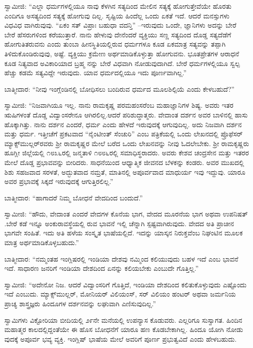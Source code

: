 ಸ್ವಾಮೀಜಿ: “ಎಲ್ಲಾ ಧರ್ಮಗಳಲ್ಲಿಯೂ ನಾವು ಕೆಳಗಿನ ಸತ್ಯದಿಂದ ಮೇಲಿನ ಸತ್ಯಕ್ಕೆ ಹೋಗುತ್ತೇವೆಯೇ ಹೊರತು ಎಂದಿಗೂ ಅಸತ್ಯದಿಂದ ಸತ್ಯಕ್ಕೆ ಹೋಗುವು ದಿಲ್ಲ. ಸೃಷ್ಟಿಯ ಹಿಂದೆಲ್ಲ ಒಂದು ಏಕತೆ ಇದೆ. ಆದರೆ ಮನಸ್ಸುಗಳು ವಿಧವಿಧ ವಾಗಿರುವುವು. “ಏಕಂ ಸತ್​ ವಿಪ್ರಾಃ ಬಹುಧಾ ವದನ್ತಿ” –ಇರುವುದು ಒಂದೇ, ಜ್ಞಾನಿಗಳು ಅದನ್ನು ಬೇರೆ ಬೇರೆ ಹೆಸರುಗಳಿಂದ ಕರೆಯುತ್ತಾರೆ. ನಾನು ಹೇಳುವು ದೇನೆಂದರೆ ವ್ಯಕ್ತಿಯು ಸಣ್ಣ ಸತ್ಯದಿಂದ ದೊಡ್ಡ ಸತ್ಯದೆಡೆಗೆ ಹೋಗುತಿತರುವನು ಎಂದು ತುಂಬಾ ಹೀನಸ್ಥಿತಿಯಲ್ಲಿರುವ ಧರ್ಮಗಳೂ ಕೂಡ ಏಕಮಾತ್ರ ಸತ್ಯವನ್ನು ತಪ್ಪಾಗಿ ತಿಳಿದುಕೊಂಡಿರುವುವು, ಅಷ್ಟೆ. ವ್ಯಕ್ತಿಯು ಕ್ರಮೇಣ ಅರ್ಥಮಾಡಿಕೊಳ್ಳುತ್ತಾ ಹೋಗುವನು. ಭೂತಪ್ರೇತಗಳ ಆರಾಧನೆ ಕೂಡ ನಿತ್ಯವಾದ ಅವಿಕಾರಿಯಾದ ಬ್ರಹ್ಮ ನನ್ನು ಬೇರೆ ವಿಧವಾಗಿ ನೋಡುವುದಾಗಿದೆ. ಬೇರೆ ಧರ್ಮಗಳಲ್ಲಿಯೂ ಸ್ವಲ್ಪ ಹೆಚ್ಚು ಕಡಮೆ ಸತ್ಯವಿದ್ದೇ ಇರುವುದು. ಯಾವ ಧರ್ಮದಲ್ಲಿಯೂ ಇದು ಪೂರ್ಣವಾಗಿಲ್ಲ.”

ಬಾತ್ಮೀದಾರ: “ನೀವು ಇಂಗ್ಲೆಂಡಿನಲ್ಲಿ ಬೋಧಿಸಲು ಬಂದಿರುವ ಧರ್ಮದ ಮೂಲಶಿಲ್ಪಿಯೆ ಎಂದು ಕೇಳಬಹುದೆ?”

ಸ್ವಾಮೀಜಿ: “ನಿಜವಾಗಿಯೂ ಇಲ್ಲ. ನಾನು ರಾಮಕೃಷ್ಣ ಪರಮಹಂಸರೆಂಬ ಮಹಾಜ್ಞಾನಿಗಳ ಶಿಷ್ಯ. ಅವರು ಇತರ ಋಷಿಗಳಂತೆ ದೊಡ್ಡ ವಿದ್ವಾಂಸರೇನೂ ಆಗಿರಲಿಲ್ಲ.ಆದರೆ ಪರಿಶುದ್ಧಾತ್ಮರು. ವೇದಾಂತ ದರ್ಶನ ಅವರ ಬಾಳಿನಲ್ಲಿ ಹಾಸು ಹೊಕ್ಕಾಗಿತ್ತು. ನಾನು ದರ್ಶನ ಎಂದರೆ, ಧರ್ಮ ಎಂದು ಹೇಳದೆ ಇರುವುದಕ್ಕೆ ಆಗುವುದಿಲ್ಲ. ಅದು ನಿಜವಾಗಿ ದರ್ಶನ ಮತ್ತು ಧರ್ಮ. ಇತ್ತೀಚೆಗೆ ಪ್ರಕಟವಾದ “ನೈಂಟೀಂತ್​ ಸೆಂಚುರಿ” ಎಂಬ ಪತ್ರಿಕೆಯಲ್ಲಿ ಒಂದು ಲೇಖನದಲ್ಲಿ ಪ್ರೊಫೆಸರ್​ ಮ್ಯಾಕ್ಸ್​ಮುಲ್ಲರ್​ರವರು ಶ‍್ರೀ ರಾಮಕೃಷ್ಣರ ಮೇಲೆ ಬರೆದ ಒಂದು ಲೇಖನವನ್ನು ನೀವು ಓದಲೇಬೇಕು. ಶ‍್ರೀ ರಾಮಕೃಷ್ಣರು ಹೂಗ್ಲೀ ಜಿಲ್ಲೆಯಲ್ಲಿ ೧೮೩೬ರಲ್ಲಿ ಜನ್ಮತಾಳಿ ೧೮೮೬ರಲ್ಲಿ ಸಮಾಧಿಸ್ಥರಾದರು. ಅವರು ಕೇಶವ ಚಂದ್ರಸೇನ ಮತ್ತು ಇತರರ ಮೇಲೆ ದೊಡ್ಡ ಪ್ರಭಾವವನ್ನು ಬೀರಿದರು. ಸಾಧನೆಯಿಂದ ಆಧ್ಯಾತ್ಮಿಕ ಜೀವನದ ಬೆಳಕನ್ನು ಕಂಡರು. ಅವರ ಮುಖದಲ್ಲಿ ಶಿಶು ಸಹಜವಾದ ಸರಳತೆ, ಅದ್ಭುತವಾದ ನಮ್ರತೆ, ಮಾತಿನಲ್ಲಿ ಅಪೂರ್ವವಾದ ಮಾಧುರ್ಯ ಇವು ಇದ್ದುವು. ಯಾರೂ ಅವರ ಪ್ರಭಾವಕ್ಕೆ ಸಿಕ್ಕದೆ ಇರುವುದಕ್ಕೆ ಆಗುತ್ತಿರಲಿಲ್ಲ.”

ಬಾತ್ಮೀದಾರ: “ಹಾಗಾದರೆ ನಿಮ್ಮ ಬೋಧನೆ ವೇದದಿಂದ ಬಂದುದೆ.”

ಸ್ವಾಮೀಜಿ: “ಹೌದು, ವೇದಾಂತ ಎಂದರೆ ವೇದಗಳ ಕೊನೆಯ ಭಾಗ, ವೇದದ ಮೂರನೆಯ ಭಾಗ ಅಥವಾ ಉಪನಿಷತ್​.ಬೇರೆ ಕಡೆ ಇನ್ನೂ ಅಂಕುರಾವಸ್ಥೆಯಲ್ಲಿ ರುವ ಭಾವನೆ ಇಲ್ಲಿ ಚೆನ್ನಾಗಿ ಸ್ಪಷ್ಟವಾಗಿರುವುದು. ವೇದದ ಅತಿ ಪ್ರಾಚೀನ ಭಾಗವೇ ಸಂಹಿತೆ. ಇದು ಅತಿ ಹಳೆಯ ಸಂಸ್ಕೃತ ಭಾಷೆಯಲ್ಲಿದೆ. ಇದನ್ನು ಯಾಸ್ಕನ ನಿರುಕ್ತವೆಂಬ ನಿಘಂಟಿನ ಮೂಲಕ ಮಾತ್ರ ಅರ್ಥಮಾಡಿಕೊಳ್ಳಬಹುದು.”

ಬಾತ್ಮೀದಾರ: “ನಮ್ಮಂತಹ ಇಂಗ್ಲಿಷರಲ್ಲಿ ಇಂಡಿಯಾ ದೇಶವು ನಮ್ಮಿಂದ ಕಲಿಯುವುದು ಬಹಳ ಇದೆ ಎಂಬ ಭಾವನೆ ಇದೆ. ಸಾಧಾರಣ ಜನರಿಗೆ ಇಂಡಿಯಾ ದೇಶದಿಂದ ಏನನ್ನು ಕಲಿಯಬೇಕು ಎಂಬುದೇ ಗೊತ್ತಿಲ್ಲ.”

ಸ್ವಾಮೀಜಿ: “ಅದೇನೋ ನಿಜ. ಆದರೆ ವಿದ್ವಾಂಸರಿಗೆ ಗೊತ್ತಿದೆ, ಇಂಡಿಯಾ ದೇಶದಿಂದ ಕಲಿತುಕೊಳ್ಳುವುದು ಎಷ್ಟೊಂದು ಇದೆ ಎಂಬುದು. ಮ್ಯಾಕ್ಸ್​ಮುಲ್ಲರ್​, ಮೋನಿಯರ್​ ವಿಲಿಯಂಸ್​, ಸರ್​ ವಿಲಿಯಂ ಹಂಟರ್​ ಅಥವಾ ಜರ್ಮನಿಯ ಪ್ರಾಚ್ಯ ಶಾಸ್ತ್ರಜ್ಞರು ಹಿಂದೂಗಳ ದರ್ಶನವನ್ನು ಲಘುವಾಗಿ ಎಣಿಸುವುದಿಲ್ಲ.”

\delimiter

ಸ್ವಾಮಿಗಳು ವಿಕ್ಟೋರಿಯಾ ಬೀದಿಯಲ್ಲಿ ೨೯ನೇ ಮನೆಯಲ್ಲಿ ಉಪನ್ಯಾಸ ಕೊಡುವರು. ಎಲ್ಲರಿಗೂ ಸುಸ್ವಾಗತ. ಹಿಂದಿನ ಮಹಾತ್ಮರ ಕಾಲದಲ್ಲಿದ್ದಂತೆಯೇ ಈ ಹೊಸ ಬೋಧನೆಗೆ ಯಾರೂ ಹಣ ಕೊಡಬೇಕಾಗಿಲ್ಲ. ಹಿಂದೂ ಯೋಗಿ ನೋಡು ವುದಕ್ಕೆ ಅಪೂರ್ವ ಭವ್ಯ ವ್ಯಕ್ತಿ. ಇಂಗ್ಲಿಷ್​ ಭಾಷೆಯ ಮೇಲೆ ಅವರಿಗೆ ಪೂರ್ಣ ಪ್ರಭುತ್ವವಿದೆ ಎಂದು ಹೇಳಬಹುದು.

